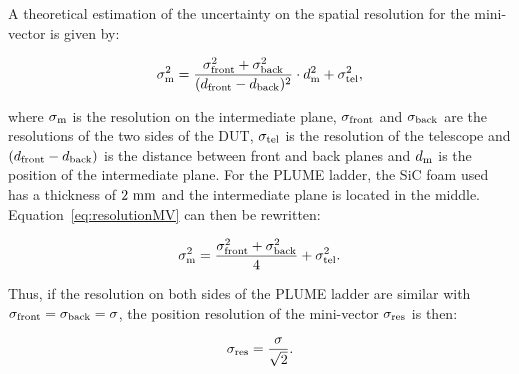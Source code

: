     A theoretical estimation of the uncertainty on the spatial resolution for the mini-vector is given by:

    \begin{equation}
      \sigma_{\rm{m}}^2 = \frac{\sigma_{\rm{front}}^2 + \sigma_{\rm{back}}^2}{(d_{\rm{front}} - d_{\rm{back}})^2} \cdot d_{\rm{m}}^2 + \sigma_{\rm{tel}}^2,
      \label{eq:resolutionMV}
    \end{equation}

    where $\sigma_{\rm{m}}$ is the resolution on the intermediate plane, $\sigma_{\rm{front}}$ and $\sigma_{\rm{back}}$ are the resolutions of the two sides of the \gls{DUT}, $\sigma_{\rm{tel}}$ is the resolution of the telescope and $(d_{\rm{front}} - d_{\rm{back}})$ is the distance between front and back planes and $d_{\rm{m}}$ is the position of the intermediate plane.
    For the \gls{PLUME} ladder, the \gls{SiC} foam used has a thickness of $2~\rm{mm}$ and the intermediate plane is located in the middle.
    Equation~\ref{eq:resolutionMV} can then be rewritten:

    \begin{equation}
      \sigma_{\rm{m}}^2 = \frac{\sigma_{\rm{front}}^2 + \sigma_{\rm{back}}^2}{4} + \sigma_{\rm{tel}}^2.
    \end{equation}

    Thus, if the resolution on both sides of the \gls{PLUME} ladder are similar with $\sigma_{\rm{front}} = \sigma_{\rm{back}} = \sigma$, the position resolution of the mini-vector $\sigma_{\rm{res}}$ is then:

    \begin{equation}
      \sigma_{\rm{res}} = \frac{\sigma}{\sqrt{2}}.
    \end{equation}

